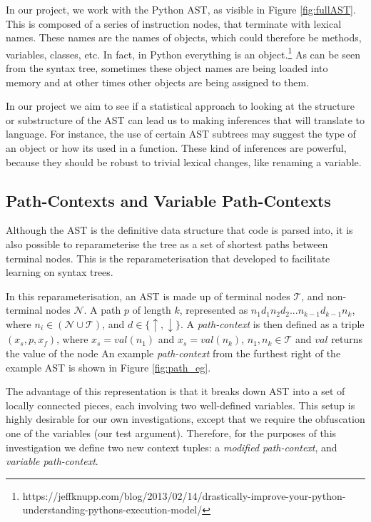 In our project, we work with the Python AST, as visible in Figure \ref{fig:fullAST}.
This is composed of a series of instruction nodes, that terminate with lexical names. 
These names are the names of objects, which could therefore be methods, variables, classes, etc. 
In fact, in Python everything is an object.\footnote{https://jeffknupp.com/blog/2013/02/14/drastically-improve-your-python-understanding-pythons-execution-model/} 
As can be seen from the syntax tree, sometimes these object names are being loaded into memory and at other times other objects are being assigned to them.

In our project we aim to see if a statistical approach to looking at the structure or substructure of the AST can lead us to making inferences that will translate to language. 
For instance, the use of certain AST subtrees may suggest the type of an object or how its used in a function.
These kind of inferences are powerful, because they should be robust to trivial lexical changes, like renaming a variable.

\subsection{Path-Contexts and Variable Path-Contexts} %
\label{sub:abstract_syntax_trees}

Although the AST is the definitive data structure that code is parsed into, it is also possible to reparameterise the tree as a set of shortest paths between terminal nodes. 
This is the reparameterisation that \citet{alon_general_2018} developed to facilitate learning on syntax trees.

In this reparameterisation, an AST is made up of terminal nodes $\mathcal{T}$, and non-terminal nodes $\mathcal{N}$. 
A path $p$ of length $k$, represented as $n_{1}d_{1}n_{2}d_{2}...n_{k-1}d_{k-1}n_{k}$, where $n_i \in (\mathcal{N} \cup \mathcal{T})$, and $d \in \{\uparrow, \downarrow\}$. 
A \textit{path-context} is then defined as a triple $(x_s, p, x_f)$, where $x_s = val(n_1) $ and $x_s = val(n_k)$, $n_1,n_k \in \mathcal{T}$ and $val$ returns the value of the node \citep{alon_general_2018} 
An example \textit{path-context} from the furthest right of the example AST is shown in Figure \ref{fig:path_eg}.

The advantage of this representation is that it breaks down AST into a set of locally connected pieces, each involving two well-defined variables.
This setup is highly desirable for our own investigations, except that we require the obfuscation one of the variables (our test argument).
Therefore, for the purposes of this investigation we define two new context tuples: a \textit{modified path-context}, and \textit{variable path-context}.

